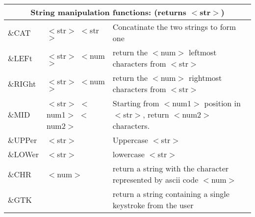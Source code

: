 \begin{tabular}{p{.8in}p{1.7in}p{250pt}}
\multicolumn{3}{c}{String manipulation functions:
(returns $<${}str$>${})}\\ \hline

\&CAT & $<${}str$>${} $<${}str$>${} & Concatinate the two strings to
form one\\

\&LEFt & $<${}str$>${} $<${}num$>${} & return the $<${}num$>${}
leftmost characters from $<${}str$>${}\\

\&RIGht & $<${}str$>${} $<${}num$>${} & return the $<${}num$>${}
rightmost characters from $<${}str$>${}\\

\&MID & $<${}str$>${} $<${}num1$>${} $<${}num2$>${} & Starting from
$<${}num1$>${} position in $<${}str$>${}, return $<${}num2$>${}
characters.\\

\&UPPer & $<${}str$>${} & Uppercase $<${}str$>${}\\

\&LOWer & $<${}str$>${} & lowercase $<${}str$>${}\\

\&CHR & $<${}num$>${} & return a string with the character
represented by ascii code $<${}num$>${}\\

\&GTK & & return a string containing a single
keystroke from the user\\

\end{tabular}

